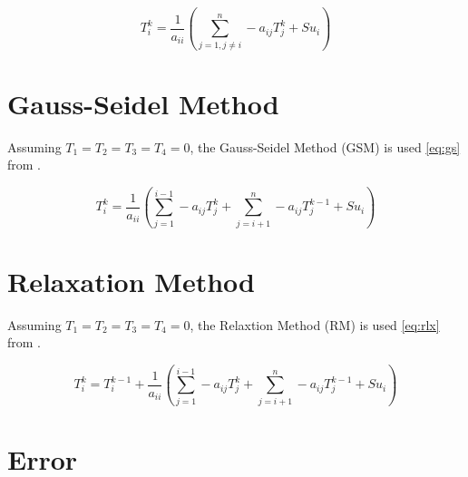 \begin{equation}
	\label{eq:jacobi}	
	T_i^k = \frac{1}{a_{ii}} \left( \sum_{j=1, j \neq i}^{n} - a_{ij} T_j^k  + Su_i \right)
\end{equation}

\chapter{Gauss-Seidel Method}
\label{chap:gauss}

Assuming $T_1=T_2=T_3=T_4=0$, the Gauss-Seidel Method (GSM) is used \ref{eq:gs} from \cite{cfdbook}.

\begin{equation}
	\label{eq:gs}	
	T_i^k = \frac{1}{a_{ii}} \left( \sum_{j=1}^{i-1} - a_{ij} T_j^k  + \sum_{j=i+1}^{n} - a_{ij} T_j^{k-1} + Su_i \right)
\end{equation}

\chapter{Relaxation Method}
\label{chap:relax}


Assuming $T_1=T_2=T_3=T_4=0$, the Relaxtion Method (RM) is used \ref{eq:rlx} from \cite{cfdbook}.

\begin{equation}
	\label{eq:rlx}	
	T_i^k = T_i^{k-1} + \frac{1}{a_{ii}} \left( \sum_{j=1}^{i-1} - a_{ij} T_j^k  + \sum_{j=i+1}^{n} - a_{ij} T_j^{k-1} + Su_i \right)
\end{equation}

\chapter{Error}
\label{chap:error}



